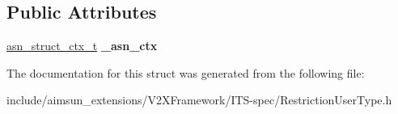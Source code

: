 \subsection*{Public Attributes}
\begin{DoxyCompactItemize}
\item 
\hyperlink{structasn__struct__ctx__s}{asn\+\_\+struct\+\_\+ctx\+\_\+t} {\bfseries \+\_\+asn\+\_\+ctx}\hypertarget{structRestrictionUserType_1_1RestrictionUserType__u_1_1RestrictionUserType____regional_a5bbb3035202f7a819763e1f0315632f9}{}\label{structRestrictionUserType_1_1RestrictionUserType__u_1_1RestrictionUserType____regional_a5bbb3035202f7a819763e1f0315632f9}

\end{DoxyCompactItemize}


The documentation for this struct was generated from the following file\+:\begin{DoxyCompactItemize}
\item 
include/aimsun\+\_\+extensions/\+V2\+X\+Framework/\+I\+T\+S-\/spec/Restriction\+User\+Type.\+h\end{DoxyCompactItemize}
